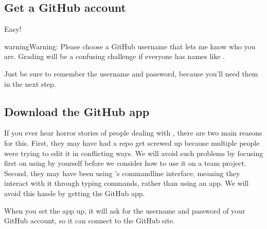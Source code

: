 \documentclass[letterpaper,10pt,english]{sphinxmanual}
\begin{document}
\subsection{Get a GitHub account}
\label{\detokenize{chapter-8-version-control:get-a-github-account}}
  Easy!

\begin{sphinxadmonition}{warning}{Warning:}
Please choose a GitHub username that lets me know who you are.  Grading will be a confusing challenge if everyone has names like .
\end{sphinxadmonition}

Just be sure to remember the username and password, because you’ll need them in the next step.


\subsection{Download the GitHub app}
\label{\detokenize{chapter-8-version-control:download-the-github-app}}
If you ever hear horror stories of people dealing with , there are two main reasons for this.  First, they may have had a repo get screwed up because multiple people were trying to edit it in conflicting ways.  We will avoid such problems by focusing first on using  by yourself before we consider how to use it on a team project.  Second, they may have been using ’s command\sphinxhyphen{}line interface, meaning they interact with it through typing commands, rather than using an app.  We will avoid this hassle by getting the GitHub app.


When you set the app up, it will ask for the username and password of your GitHub account, so it can connect to the GitHub site.
\end{document}
